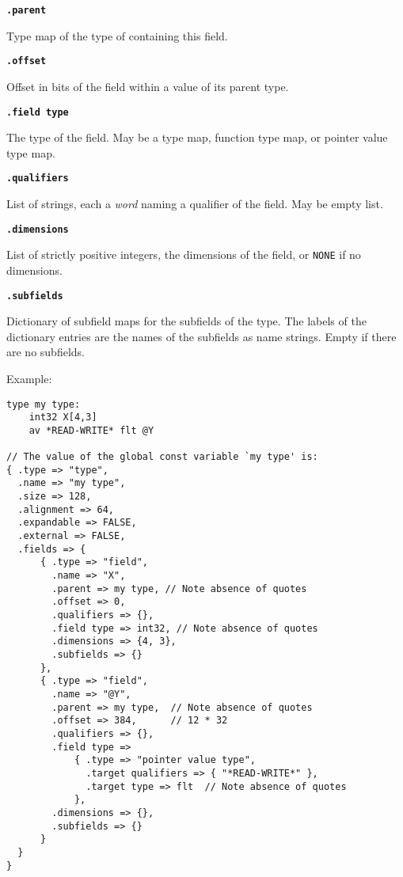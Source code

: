 \documentclass[12pt]{article}
\newcommand{\ttkey}[1]{{\tt \bfseries #1}}
\newenvironment{indpar}[1][0.3in]%
	{\begin{list}{}%
		     {\setlength{\itemsep}{0in}%
		      \setlength{\topsep}{0in}%
		      \setlength{\parsep}{1ex}%
		      \setlength{\labelwidth}{#1}%
		      \setlength{\leftmargin}{#1}%
		      \addtolength{\leftmargin}{\labelsep}}%
	 \item}%
	{\end{list}}
\begin{document}
\ttkey{.parent}
\begin{indpar}
Type map of the type of containing this field.
\end{indpar}

\ttkey{.offset}
\begin{indpar}
Offset in bits of the field within a value of its parent type.
\end{indpar}

\ttkey{.field type}
\begin{indpar}
The type of the field.  May be a type map, function type map,
or pointer value type map.
\end{indpar}

\ttkey{.qualifiers}
\begin{indpar}
List of strings, each a {\em word} naming a qualifier
of the field.  May be empty list.
\end{indpar}

\ttkey{.dimensions}
\begin{indpar}
List of strictly positive integers, the dimensions of the field, or {\tt NONE}
if no dimensions.
\end{indpar}

\ttkey{.subfields}
\begin{indpar}
Dictionary of subfield maps for the subfields of the type.  The labels
of the dictionary entries are the names of the subfields as name strings.
Empty if there are no subfields.
\end{indpar}

Example:
\begin{indpar}\begin{verbatim}
type my type:
    int32 X[4,3]
    av *READ-WRITE* flt @Y

// The value of the global const variable `my type' is:
{ .type => "type",
  .name => "my type",
  .size => 128,
  .alignment => 64,
  .expandable => FALSE,
  .external => FALSE,
  .fields => {
      { .type => "field",
        .name => "X",
        .parent => my type, // Note absence of quotes
        .offset => 0,
        .qualifiers => {},
        .field type => int32, // Note absence of quotes
        .dimensions => {4, 3},
        .subfields => {}
      },
      { .type => "field",
        .name => "@Y",
        .parent => my type,  // Note absence of quotes
        .offset => 384,      // 12 * 32
        .qualifiers => {},
        .field type =>
            { .type => "pointer value type",
              .target qualifiers => { "*READ-WRITE*" },
              .target type => flt  // Note absence of quotes
            },
        .dimensions => {},
        .subfields => {}
      }
  }
}

\end{verbatim}\end{indpar}
\end{document}
